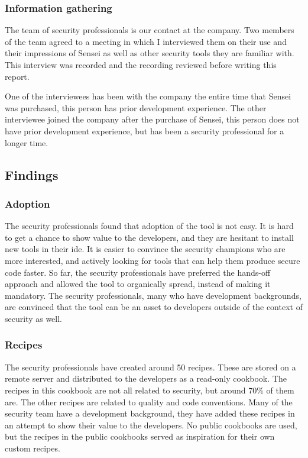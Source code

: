 \subsubsection{Information gathering}
The team of security professionals is our contact at the company.
Two members of the team agreed to a meeting in which I interviewed them on their use and their impressions of Sensei as well as other security tools they are familiar with.
This interview was recorded and the recording reviewed before writing this report.

One of the interviewees has been with the company the entire time that Sensei was purchased, this person has prior development experience.
The other interviewee joined the company after the purchase of Sensei, this person does not have prior development experience, but has been a security professional for a longer time.

\subsection{Findings}

\subsubsection{Adoption}
The security professionals found that adoption of the tool is not easy.
It is hard to get a chance to show value to the developers, and they are hesitant to install new tools in their \gls{ide}.
It is easier to convince the security champions who are more interested, and actively looking for tools that can help them produce secure code faster.
So far, the security professionals have preferred the hands-off approach and allowed the tool to organically spread, instead of making it mandatory.
The security professionals, many who have development backgrounds, are convinced that the tool can be an asset to developers outside of the context of security as well.

\subsubsection{Recipes}
The security professionals have created around 50 recipes.
These are stored on a remote server and distributed to the developers as a read-only cookbook.
The recipes in this cookbook are not all related to security, but around 70\% of them are.
The other recipes are related to quality and code conventions.
Many of the security team have a development background, they have added these recipes in an attempt to show their value to the developers.
No public cookbooks are used, but the recipes in the public cookbooks served as inspiration for their own custom recipes.

